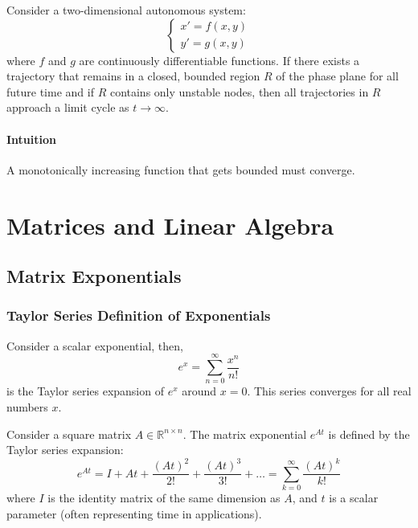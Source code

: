 \documentclass[11pt]{article}
\begin{document}
\begin{theorem}
    Consider a two-dimensional autonomous system:
    $$\begin{cases}
        x' = f(x, y) \\
        y' = g(x, y)
    \end{cases}$$
    where \( f \) and \( g \) are continuously differentiable functions. If there exists a trajectory that remains in a closed, bounded region \( R \) of the phase plane for all future time and if \( R \) contains only unstable nodes, then all trajectories in \( R \) approach a limit cycle as \( t \to \infty \).
\end{theorem}
\paragraph{Intuition} A monotonically increasing function that gets bounded must converge. 

\section{Matrices and Linear Algebra}

\subsection{Matrix Exponentials}
\begin{shaded}
\subsubsection*{Taylor Series Definition of Exponentials}
Consider a scalar exponential, then,
$$e^x = \sum_{n=0}^{\infty} \frac{x^n}{n!}$$
is the Taylor series expansion of \( e^x \) around \( x = 0 \). This series converges for all real numbers \( x \).
\end{shaded}

\begin{definition}
    Consider a square matrix \( A \in \mathbb{R}^{n \times n} \). The matrix exponential \( e^{At} \) is defined by the Taylor series expansion:
    \begin{equation}
    e^{At} = I + At + \frac{(At)^2}{2!} + \frac{(At)^3}{3!} + \ldots = \sum_{k=0}^{\infty} \frac{(At)^k}{k!}
    \end{equation}
    where \( I \) is the identity matrix of the same dimension as \( A \), and \( t \) is a scalar parameter (often representing time in applications).
\end{definition}
\end{document}
